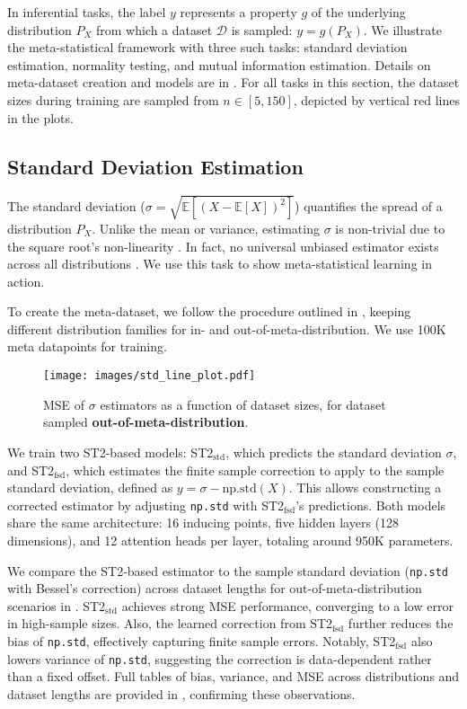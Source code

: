 In inferential tasks, the label \( y \) represents a property \( g \) of the underlying distribution \( P_X \) from which a dataset \( \mathcal{D} \) is sampled: \( y = g(P_X) \). We illustrate the meta-statistical framework with three such tasks: standard deviation estimation, normality testing, and mutual information estimation. Details on meta-dataset creation and models are in . For all tasks in this section, the dataset sizes during training are sampled from $n \in [5, 150]$, depicted by vertical red lines in the plots. 

\subsection{Standard Deviation Estimation}  
The standard deviation (\( \sigma = \sqrt{\mathbb{E}[(X - \mathbb{E}[X])^2]}\)) quantifies the spread of a distribution \( P_X \). Unlike the mean or variance, estimating \( \sigma \) is non-trivial due to the square root's non-linearity \cite{gurland1971simple,gupta1952estimation}. In fact, no universal unbiased estimator exists across all distributions \cite{gurland1971simple,fenstad1980robust}. We use this task to show meta-statistical learning in action.  


 To create the meta-dataset, we follow the procedure outlined in , keeping different distribution families for in- and out-of-meta-distribution. We use 100K meta datapoints for training.

\begin{figure}
    \centering
    \texttt{[image: images/std\_line\_plot.pdf]}
    \caption{MSE of $\sigma$ estimators as a function of dataset sizes, for dataset sampled \textbf{out-of-meta-distribution}.}
    \label{fig:std_line_plot}
\end{figure}


We train two ST2-based models: ST2$_{\text{std}}$, which predicts the standard deviation \( \sigma \), and ST2$_{\text{fsd}}$, which estimates the finite sample correction to apply to the sample standard deviation, defined as \( y = \sigma - \text{np.std}(X) \). This allows constructing a corrected estimator by adjusting \texttt{np.std} with ST2$_{\text{fsd}}$'s predictions. Both models share the same architecture: 16 inducing points, five hidden layers (128 dimensions), and 12 attention heads per layer, totaling around 950K parameters.  


We compare the ST2-based estimator to the sample standard deviation (\texttt{np.std} with Bessel’s correction) across dataset lengths for out-of-meta-distribution scenarios in . ST2$_{\text{std}}$ achieves strong MSE performance, converging to a low error in high-sample sizes. Also, the learned correction from ST2$_{\text{fsd}}$ further reduces the bias of \texttt{np.std}, effectively capturing finite sample errors. Notably, ST2$_{\text{fsd}}$ also lowers variance of \texttt{np.std}, suggesting the correction is data-dependent rather than a fixed offset. 
Full tables of bias, variance, and MSE across distributions and dataset lengths are provided in , confirming these observations.


